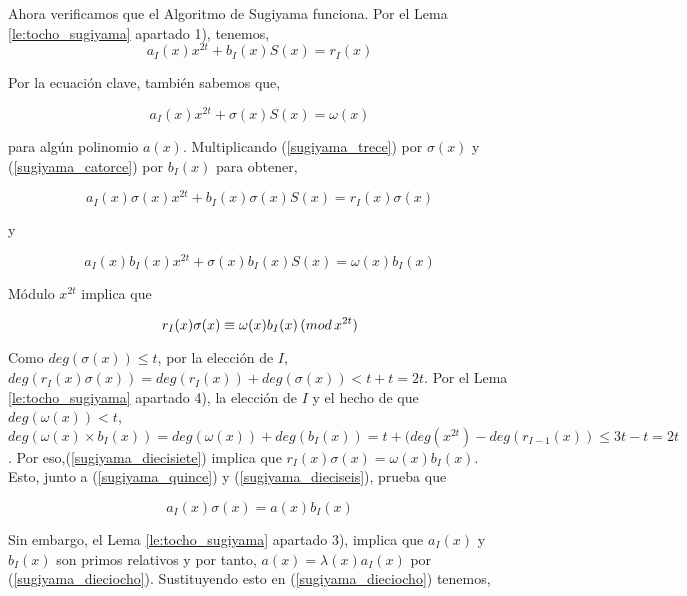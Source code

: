 Ahora verificamos que el Algoritmo de Sugiyama funciona. Por el Lema \ref{le:tocho_sugiyama} apartado 1), tenemos, 
\begin{equation}
\label{sugiyama_trece}
a_I(x)x^{2t} + b_I(x)S(x) = r_I(x)
\end{equation}

Por la ecuación clave, también sabemos que,

\begin{equation}
\label{sugiyama_catorce}
a_I(x)x^{2t} + \sigma(x)S(x) = \omega(x)
\end{equation}

para algún polinomio $a(x)$. Multiplicando (\ref{sugiyama_trece}) por $\sigma(x)$ y (\ref{sugiyama_catorce}) por $b_I(x)$ para obtener,

\begin{equation}
\label{sugiyama_quince}
a_I(x)\sigma(x)x^{2t} + b_I(x)\sigma(x)S(x) = r_I(x)\sigma(x)
\end{equation}

y

\begin{equation}
\label{sugiyama_dieciseis}
a_I(x)b_I(x)x^{2t} + \sigma(x)b_I(x)S(x) = \omega(x)b_I(x)
\end{equation}


Módulo $x^{2t}$ implica que 

\begin{equation}
\label{sugiyama_diecisiete}
r_I(x)\sigma(x) \equiv \omega(x)b_I(x) \thinspace (mod \thinspace x^{2t})
\end{equation}


Como $deg(\sigma(x)) \leq t$, por la elección de $I$, $deg(r_I(x)\sigma(x)) = deg(r_I(x)) + deg(\sigma(x)) < t + t = 2t$. Por el Lema \ref{le:tocho_sugiyama} apartado 4), la elección de $I$ y el hecho de que $deg(\omega(x)) < t$, $deg(\omega(x) \times b_I(x)) = deg(\omega(x)) + deg(b_I(x)) = t + (deg(x^{2t}) -deg(r_{I-1}(x)) \leq 3t -t = 2t$. Por eso,(\ref{sugiyama_diecisiete}) implica que $r_I(x)\sigma(x) = \omega(x)b_I(x)$. Esto, junto a (\ref{sugiyama_quince}) y (\ref{sugiyama_dieciseis}), prueba que 


\begin{equation}
\label{sugiyama_dieciocho}
a_I(x)\sigma(x) = a(x)b_I(x)
\end{equation}

Sin embargo, el Lema \ref{le:tocho_sugiyama} apartado 3), implica que $a_I(x)$ y $b_I(x)$ son primos relativos y por tanto, $a(x) = \lambda(x)a_I(x)$ por (\ref{sugiyama_dieciocho}). Sustituyendo esto en (\ref{sugiyama_dieciocho}) tenemos,

